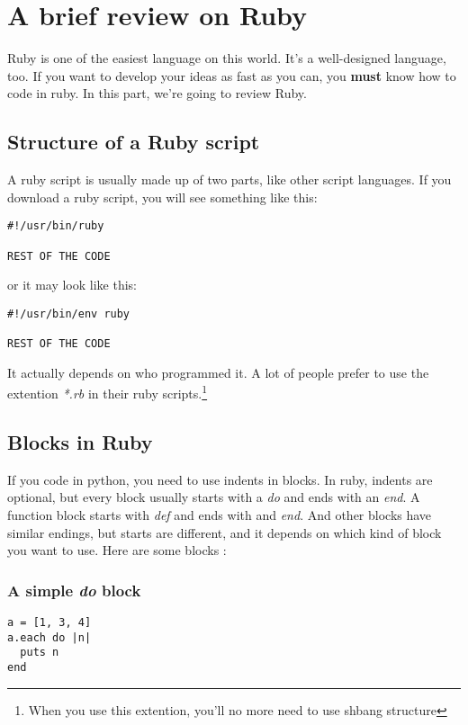 \documentclass[11pt]{article}
\begin{document}
\section{A brief review on Ruby}
Ruby is one of the easiest language on this world. It's a well-designed language, too. If you want to develop your ideas as fast as you can, you \textbf{must} know how to code in ruby. In this part, we're going to review Ruby. 
\subsection{Structure of a Ruby script}
A ruby script is usually made up of two parts, like other script languages. If you download a ruby script, you will see something like this:
\begin{verbatim}
#!/usr/bin/ruby 

REST OF THE CODE

\end{verbatim}

or it may look like this:

\begin{verbatim}
#!/usr/bin/env ruby

REST OF THE CODE

\end{verbatim}

It actually depends on who programmed it. A lot of people prefer to use the extention \textit{*.rb} in their ruby scripts.\footnote{When you use this extention, you'll no more need to use shbang structure}

\subsection{Blocks in Ruby}
If you code in python, you need to use indents in blocks. In ruby, indents are optional, but every block usually starts with a \textit{do} and ends with an \textit{end}. A function block starts with \textit{def} and ends with and \textit{end}. And other blocks have similar endings, but starts are different, and it depends on which kind of block you want to use. Here are some blocks :
\subsubsection{A simple \textit{do} block}

\begin{verbatim}
a = [1, 3, 4]
a.each do |n|
  puts n
end
\end{verbatim}
\end{document}
